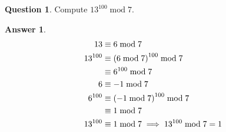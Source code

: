 \documentclass[article, 12pt]{article}
\theoremstyle{definition}
\newtheorem{question}{Question}
\newtheorem{answer}{Answer}
\DeclarePairedDelimiter\paren{(}{)} %
\newcommand{\Mod}[1]{\;\mathrm{mod}\; #1} %
\begin{document}
    \begin{question}
        Compute $13^{100}\Mod{7}$.
    \end{question}
    \begin{answer}
        \begin{align*}
            13 &\equiv 6 \Mod{7} \\
            13^{100} &\equiv \paren*{6\Mod{7}}^{100} \Mod{7} \\
            &\equiv 6^{100} \Mod{7} \\
            6 &\equiv -1 \Mod{7} \\
            6^{100} &\equiv \paren*{-1 \Mod{7}}^{100} \Mod{7} \\
            &\equiv 1 \Mod{7} \\
            13^{100} &\equiv 1 \Mod{7} \implies 13^{100} \Mod{7} = 1
        \end{align*}
    \end{answer}
\end{document}
